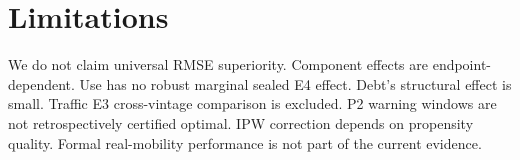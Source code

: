 \section{Limitations}
We do not claim universal RMSE superiority. Component effects are endpoint-dependent. Use has no robust marginal sealed E4 effect. Debt's structural effect is small. Traffic E3 cross-vintage comparison is excluded. P2 warning windows are not retrospectively certified optimal. IPW correction depends on propensity quality. Formal real-mobility performance is not part of the current evidence.
